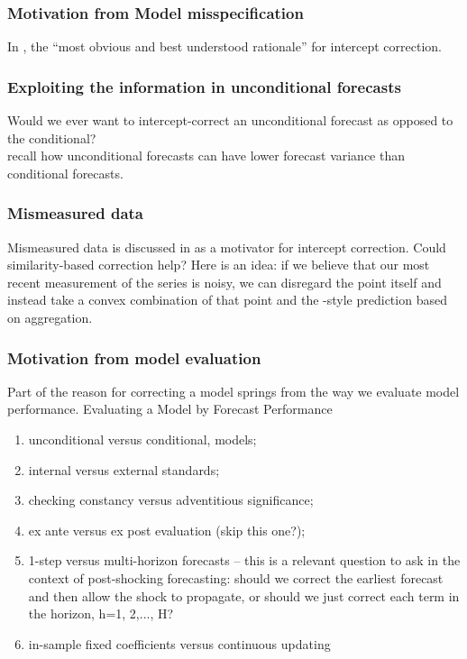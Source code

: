 \documentclass[11pt]{article}
\theoremstyle{definition}
\begin{document}
\subsubsection{Motivation from Model misspecification}
In \cite[p. 177]{hendry1994theory}, the ``most obvious and best understood rationale'' for intercept correction.\\

\subsubsection{Exploiting the information in unconditional forecasts}

Would we ever want to intercept-correct an unconditional forecast as opposed to the conditional?\\

\cite[p. 170-1]{hendry1994theory} recall how unconditional forecasts can have lower forecast variance than conditional forecasts.

\subsubsection{Mismeasured data}

Mismeasured data is discussed in \cite[p. 166]{hendry1994theory} as a motivator for intercept correction.  Could similarity-based correction help?  Here is an idea: if we believe that our most recent measurement of the series is noisy, we can disregard the point itself and instead take a convex combination of that point and the \cite{lin2021minimizing}-style prediction based on aggregation.

\subsubsection{Motivation from model evaluation}

Part of the reason for correcting a model springs from the way we evaluate model performance.
Evaluating a Model by Forecast Performance \cite{clements2005evaluating}
\begin{enumerate}
  \item   unconditional versus conditional, models;
  \item internal versus external standards;
  \item checking constancy versus adventitious significance;
  \item ex ante versus ex post evaluation (skip this one?);
  \item 1-step versus multi-horizon forecasts -- this is a relevant question to ask in the context of post-shocking forecasting: should we correct the earliest forecast and then allow the shock to propagate, or should we just correct each term in the horizon, h=1, 2,..., H?
  \item in-sample fixed coefficients versus continuous updating
\end{enumerate}
\end{document}
